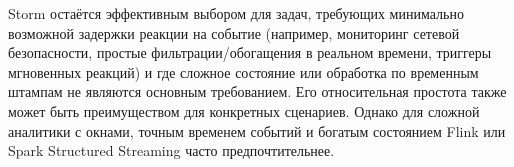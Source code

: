             
            Storm остаётся эффективным выбором для задач, требующих минимально возможной задержки реакции на событие (например, мониторинг сетевой безопасности, простые фильтрации/обогащения в реальном времени, триггеры мгновенных реакций) и где сложное состояние или обработка по временным штампам не являются основным требованием. Его относительная простота также может быть преимуществом для конкретных сценариев. Однако для сложной аналитики с окнами, точным временем событий и богатым состоянием Flink или Spark Structured Streaming часто предпочтительнее.
\newpage
